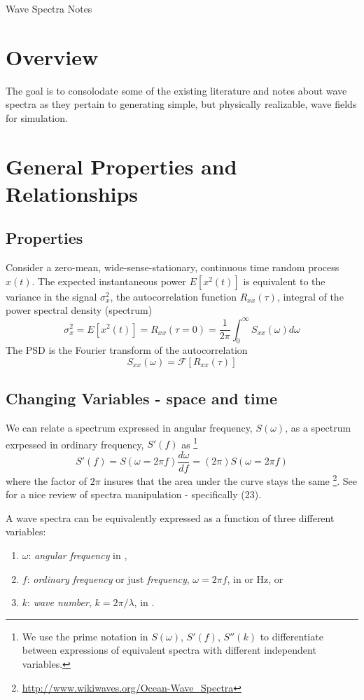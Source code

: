 \documentclass[11pt]{article}
\newcommand{\proposaltitle}{Wave Spectra Notes}
\begin{document}
\newpage
\setcounter{page}{1}
\begin{center}
{\huge \proposaltitle}
\end{center}

\section{Overview}
The goal is to consolodate some of the existing literature and notes about wave spectra as they pertain to generating simple, but physically realizable, wave fields for simulation.

\section{General Properties and Relationships}

\subsection{Properties}
Consider a zero-mean, wide-sense-stationary, continuous time random process $x(t)$.  The expected instantaneous power $E[x^2(t)]$ is equivalent to the variance in the signal $\sigma_x^2$, the autocorrelation function $R_{xx}(\tau)$, integral of the power spectral density (spectrum)
\[
\sigma_x^2 = E[x^2(t)] = R_{xx}(\tau=0) = \frac{1}{2\pi} \int_0^{\infty}S_{xx}(\omega)d\omega
\]
The PSD is the Fourier transform of the autocorrelation
\[
S_{xx}(\omega) = \mathcal{F}[ R_{xx}(\tau)]
\]


\subsection{Changing Variables - space and time}
We can relate a spectrum expressed in angular frequency, $S(\omega)$, as a spectrum exrpessed in ordinary frequency, $S'(f)$ as \footnote{We use the prime notation  in $S(\omega)$, $S'(f)$, $S''(k)$ to differentiate between expressions of equivalent spectra with different independent variables.}
\begin{equation} S'(f) = S(\omega=2 \pi f) \frac{d\omega}{df} = (2 \pi) S(\omega=2 \pi f)\end{equation}
where the factor of $2 \pi$ insures that the area under the curve stays the same \footnote{\url{http://www.wikiwaves.org/Ocean-Wave_Spectra}}.  See \cite{frechot06realistic} for a nice review of spectra manipulation - specifically (23).  

A wave spectra can be equivalently expressed as a function of three different variables:
\begin{enumerate}
\item $\omega$: \emph{angular frequency} in ,
\item $f$: \emph{ordinary frequency} or just \emph{frequency}, $\omega=2 \pi f$, in  or \unit[]{Hz}, or
\item $k$: \emph{wave number}, $k = 2 \pi/\lambda$, in .
\end{enumerate}
\end{document}
